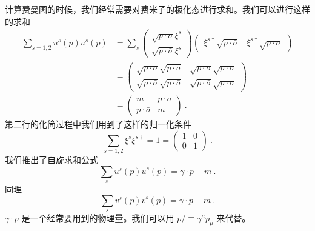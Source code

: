 
计算费曼图的时候，我们经常需要对费米子的极化态进行求和。我们可以进行这样的求和
\begin{align}\nonumber
\sum_{s = 1,2}u^s(p)\bar u^s(p ) & = \sum_s \begin{pmatrix}
\sqrt{p\cdot \sigma}\xi^s \\
\sqrt{p\cdot\bar\sigma} \xi^s
\end{pmatrix}\begin{pmatrix}
\xi^{s\dagger}\sqrt{p\cdot\bar\sigma} & \xi^{s\dagger}\sqrt{p\cdot \sigma}
\end{pmatrix}\\\nonumber
& = \begin{pmatrix}
\sqrt{p\cdot\sigma}\sqrt{p\cdot \bar \sigma} & \sqrt{p\cdot \sigma}\sqrt{p\cdot\sigma} \\
\sqrt{p\cdot\bar\sigma} \sqrt{p\cdot \bar\sigma} & \sqrt{p\cdot\bar\sigma} \sqrt{p\cdot\sigma}
\end{pmatrix} \\
& = \begin{pmatrix}
m & p\cdot \sigma \\
p\cdot \bar \sigma & m
\end{pmatrix}~.
\end{align}
第二行的化简过程中我们用到了这样的归一化条件
\begin{equation}
\sum_{s=1,2}\xi^s\xi^{s\dagger} = 1 = \begin{pmatrix}
1 & 0 \\
0 & 1
\end{pmatrix}~.
\end{equation}
我们推出了自旋求和公式
\begin{equation}
\sum_s u^s(p)\bar u^s(p) = \gamma \cdot p + m ~.
\end{equation}
同理
\begin{equation}
\sum_s v^s(p)\bar v^s(p) = \gamma\cdot p - m ~.
\end{equation}
$\gamma \cdot p$ 是一个经常要用到的物理量。我们可以用 $p\!\!\!/\equiv \gamma^\mu p_\mu$ 来代替。
